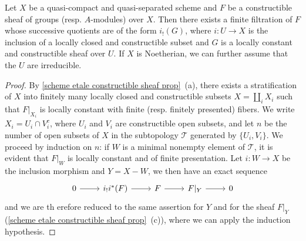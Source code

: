 \begin{proposition}\label{scheme qcqs etale constructible sheaf filtration}
Let $X$ be a quasi-compact and quasi-separated scheme and $F$ be a constructible sheaf of groups (resp. $A$-modules) over $X$. Then there exists a finite filtration of $F$ whose successive quotients are of the form $i_!(G)$, where $i:U\to X$ is the inclusion of a locally closed and constructible subset and $G$ is a locally constant and constructible sheaf over $U$. If $X$ is Noetherian, we can further assume that the $U$ are irreducible.
\end{proposition}
\begin{proof}
By \cref{scheme etale constructible sheaf prop}~(a), there exists a stratification of $X$ into finitely many locally closed and constructible subsets $X=\coprod_iX_i$ such that $F|_{X_i}$ is locally constant with finite (resp. finitely presented) fibers. We write $X_i=U_i\cap V_i^c$, where $U_i$ and $V_i$ are constructible open subsets, and let $n$ be the number of open subsets of $X$ in the subtopology $\mathcal{T}$ generated by $\{U_i,V_i\}$. We proceed by induction on $n$: if $W$ is a minimal nonempty element of $\mathcal{T}$, it is evident that $F|_W$ is locally constant and of finite presentation. Let $i:W\to X$ be the inclusion morphism and $Y=X-W$, we then have an exact sequence
\[\begin{tikzcd}
0\ar[r]&i_!i^*(F)\ar[r]&F\ar[r]&F|_Y\ar[r]&0
\end{tikzcd}\]
and we are th erefore reduced to the same assertion for $Y$ and for the sheaf $F|_Y$ (\cref{scheme etale constructible sheaf prop}~(c)), where we can apply the induction hypothesis.
\end{proof}

